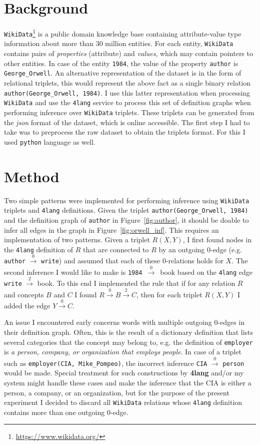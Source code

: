 \section{Background}
\texttt{WikiData}\footnote{\url{https://www.wikidata.org/}}
is a public domain knowledge base containing
attribute-value type information about more than 30 million entities.
For each entity, \texttt{WikiData} contains pairs of \textit{properties}
(attribute) and \textit{values}, which may contain pointers to other
entities. In case of the entity \texttt{1984}, the value of the property
\texttt{author} is \texttt{George\_Orwell}. An alternative
representation of the dataset is in the form of relational triplets,
this would represent the above fact as a single binary relation
\texttt{author(George\_Orwell, 1984)}. I use this latter representation
when processing \texttt{WikiData} and use the \texttt{4lang} service to process this set of
definition graphs when performing inference over \texttt{WikiData} triplets. These triplets can be generated from the \textit{json} format of the dataset, which is online accessible. The first step I had to take was to preprocess the raw dataset to obtain the triplets format. For this I used \texttt{python} language as well.

\section{Method}
Two simple patterns were implemented for performing inference using
\texttt{WikiData}
triplets and \texttt{4lang} definitions. Given the triplet
\texttt{author(George\_Orwell, 1984)} and the definition graph
of \texttt{author} in Figure~\ref{fig:author}, it should be doable to
infer all edges in the graph in Figure~\ref{fig:orwell_inf}. This
requires an implementation of two patterns. Given a triplet $R(X, Y)$, I
first found nodes in the \texttt{4lang} definition of $R$ that are connected
to $R$ by an outgoing 0-edge (e.g. \texttt{author} $\xrightarrow0$
\texttt{write}) and assumed that each of these 0-relations holds for $X$.
The second inference I would like to make is \texttt{1984}~$\xrightarrow0$~book
based on the \texttt{4lang} edge \texttt{write} $\xrightarrow2$ book. To this end
I implemented the rule that if for any relation $R$ and concepts $B$ and $C$
I found $R \xrightarrow0 B \xrightarrow2 C$, then for each triplet $R(X, Y)$ I
added the edge $Y \xrightarrow0 C$. 

An issue I encountered early concerns words with multiple outgoing
0-edges in their definition graph. Often, this is the result of a
dictionary definition that lists several categories that the concept may
belong to, e.g. the definition of \texttt{employer} is \textit{a person,
	company, or organization that employs people}. In case of a triplet such
as \texttt{employer(CIA, Mike\_Pompeo)}, the incorrect inference
\texttt{CIA} $\xrightarrow0$ \texttt{person} would be made. Special treatment for such
constructions by \textbf{4lang} and/or my system might handle these cases and
make the inference that the CIA is either a person, a company, or an
organization, but for the purpose of the present experiment I decided
to discard all \texttt{WikiData} relations whose \texttt{4lang}
definition contains more than one outgoing 0-edge.


